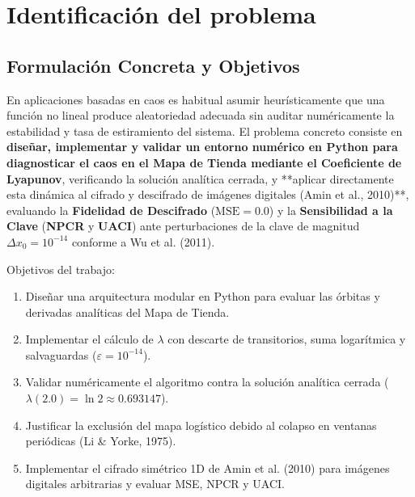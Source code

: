 \documentclass[11pt,letterpaper]{article}
\begin{document}
\section{Identificación del problema}

\subsection{Formulación Concreta y Objetivos}
En aplicaciones basadas en caos es habitual asumir heurísticamente que una función no lineal produce aleatoriedad adecuada sin auditar numéricamente la estabilidad y tasa de estiramiento del sistema. El problema concreto consiste en \textbf{diseñar, implementar y validar un entorno numérico en Python para diagnosticar el caos en el Mapa de Tienda mediante el Coeficiente de Lyapunov}, verificando la solución analítica cerrada, y **aplicar directamente esta dinámica al cifrado y descifrado de imágenes digitales (Amin et al., 2010)**, evaluando la \textbf{Fidelidad de Descifrado} ($\text{MSE} = 0.0$) y la \textbf{Sensibilidad a la Clave} (\textbf{NPCR} y \textbf{UACI}) ante perturbaciones de la clave de magnitud $\Delta x_0 = 10^{-14}$ conforme a Wu et al. (2011).

Objetivos del trabajo:
\begin{enumerate}
    \item Diseñar una arquitectura modular en Python para evaluar las órbitas y derivadas analíticas del Mapa de Tienda.
    \item Implementar el cálculo de $\lambda$ con descarte de transitorios, suma logarítmica y salvaguardas ($\varepsilon = 10^{-14}$).
    \item Validar numéricamente el algoritmo contra la solución analítica cerrada ($\lambda(2.0) = \ln 2 \approx 0.693147$).
    \item Justificar la exclusión del mapa logístico debido al colapso en ventanas periódicas (Li \& Yorke, 1975).
    \item Implementar el cifrado simétrico 1D de Amin et al. (2010) para imágenes digitales arbitrarias y evaluar MSE, NPCR y UACI.
\end{enumerate}
\end{document}
